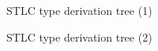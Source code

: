 \documentclass{beamer}
\begin{document}
\begin{frame}{STLC type derivation tree (1)}
\begin{center}

\end{center}
\end{frame}

\begin{frame}{STLC type derivation tree (2)}
\begin{center}
{\tiny

}
\end{center}
\end{frame}
\end{document}
